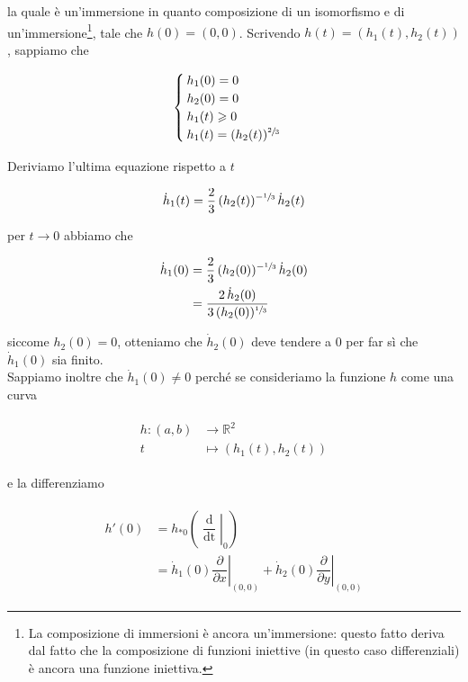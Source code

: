 la quale è un'immersione in quanto composizione di un isomorfismo e di un'immersione\footnote{%
	La composizione di immersioni è ancora un'immersione: questo fatto deriva dal fatto che la composizione di funzioni iniettive (in questo caso differenziali) è ancora una funzione iniettiva.%
}, tale che $ h(0)=(0,0) $. Scrivendo $ h(t) = (h_{1}(t),h_{2}(t)) $, sappiamo che

\begin{equation}
	\begin{cases}
		h_{1}(0) = 0\\
		h_{2}(0) = 0\\
		h_{1}(t) \geqslant 0\\
		h_{1}(t) = (h_{2}(t))^{\sfrac{2}{3}}
	\end{cases}
\end{equation}

Deriviamo l'ultima equazione rispetto a $ t $

\begin{equation}
	\dot{h}_{1}(t) = \dfrac{2}{3} \, (h_{2}(t))^{-\sfrac{1}{3}} \, \dot{h}_{2}(t)
\end{equation}

per $ t \to 0 $ abbiamo che

\begin{align}
	\begin{split}
		\dot{h}_{1}(0) &= \dfrac{2}{3} \, (h_{2}(0))^{-\sfrac{1}{3}} \, \dot{h}_{2}(0)\\
		&= \dfrac{2 \, \dot{h}_{2}(0)}{3 \, (h_{2}(0))^{\sfrac{1}{3}}}
	\end{split}	
\end{align}

siccome $ h_{2}(0)=0 $, otteniamo che $ \dot{h}_{2}(0) $ deve tendere a 0 per far sì che $ \dot{h}_{1}(0) $ sia finito.\\
Sappiamo inoltre che $ \dot{h}_{1}(0) \neq 0 $ perché se consideriamo la funzione $ h $ come una curva

\begin{align}
	\begin{split}
		h : (a,b) &\to \mathbb{R}^{2}\\
		t &\mapsto (h_{1}(t),h_{2}(t))
	\end{split}	
\end{align}

e la differenziamo

\begin{align}
	\begin{split}
		h'(0) &= h_{*0} \left( \left. \dfrac{\operatorname{d}}{\operatorname{dt}} \right|_{0} \right) \\
		&= \dot{h}_{1}(0) \left. \dfrac{\partial}{\partial x} \right|_{(0,0)} + \dot{h}_{2}(0) \left. \dfrac{\partial}{\partial y} \right|_{(0,0)}
	\end{split}
\end{align}

